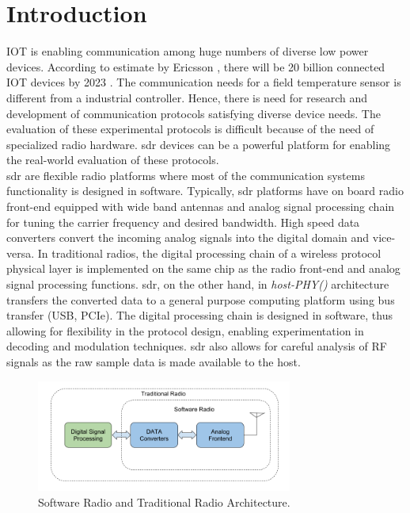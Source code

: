 \chapter{Introduction}
\ac{IOT} is enabling communication among huge numbers of diverse low power devices.  
According to estimate by Ericsson \cite{noauthor_internet_2017}, there will be 20 billion connected \ac{IOT} devices by 2023 . 
The communication needs for a field temperature sensor is different from a industrial controller. 
Hence, there is need for research and development of communication protocols satisfying diverse device needs. 
The evaluation of these experimental protocols is difficult because of the need of specialized radio hardware. 
\ac{sdr} devices can be a powerful platform for enabling the real-world evaluation of these protocols.\\

\ac{sdr} are flexible radio platforms where most of the communication systems functionality is designed in software. Typically, \ac{sdr} platforms have on board radio front-end equipped with wide band antennas and analog signal processing chain for tuning the carrier frequency and desired bandwidth. High speed data converters convert the incoming analog signals into the digital domain and vice-versa. In traditional radios, the digital processing chain of a wireless protocol physical layer is implemented on the same chip as the radio front-end and analog signal processing functions. \ac{sdr}, on the other hand, in \textit{host-PHY(\cite{schmid_experimental_2007})} architecture transfers the converted data to a general purpose computing platform using bus transfer (USB, PCIe).  The digital processing chain is designed in software, thus allowing for flexibility in the protocol design, enabling experimentation in decoding and modulation techniques. \ac{sdr} also allows for careful analysis of RF signals as the raw sample data is made available to the host.\\

\begin{figure}[!h]
\centering
\includegraphics[width=0.75\textwidth]{Figure/SDRSystem.png}
\caption{Software Radio and Traditional Radio Architecture.}
\label{sdr_architecture}
\end{figure}



